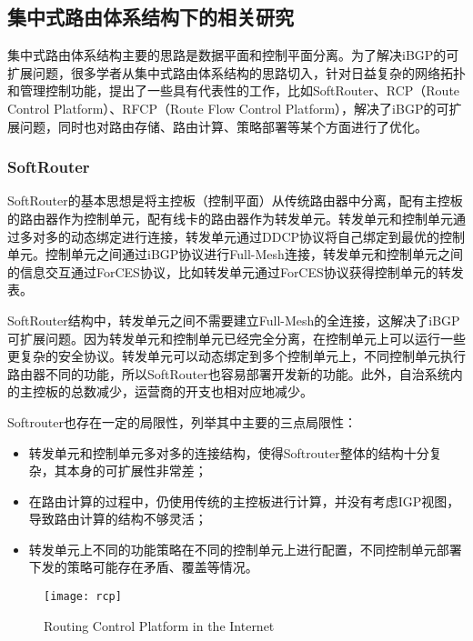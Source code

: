 \subsection{集中式路由体系结构下的相关研究}

集中式路由体系结构主要的思路是数据平面和控制平面分离。为了解决iBGP的可扩展问题，很多学者从集中式路由体系结构的思路切入，针对日益复杂的网络拓扑和管理控制功能，提出了一些具有代表性的工作，比如SoftRouter、RCP（Route Control Platform）、RFCP（Route Flow Control Platform），解决了iBGP的可扩展问题，同时也对路由存储、路由计算、策略部署等某个方面进行了优化。

\subsubsection{SoftRouter\cite{lakshman2004}}
SoftRouter的基本思想是将主控板（控制平面）从传统路由器中分离，配有主控板的路由器作为控制单元，配有线卡的路由器作为转发单元。转发单元和控制单元通过多对多的动态绑定进行连接，转发单元通过DDCP协议将自己绑定到最优的控制单元。控制单元之间通过iBGP协议进行Full-Mesh连接，转发单元和控制单元之间的信息交互通过ForCES\cite{rfc3746}协议，比如转发单元通过ForCES协议获得控制单元的转发表。

SoftRouter结构中，转发单元之间不需要建立Full-Mesh的全连接，这解决了iBGP可扩展问题。因为转发单元和控制单元已经完全分离，在控制单元上可以运行一些更复杂的安全协议。转发单元可以动态绑定到多个控制单元上，不同控制单元执行路由器不同的功能，所以SoftRouter也容易部署开发新的功能。此外，自治系统内的主控板的总数减少，运营商的开支也相对应地减少。

Softrouter也存在一定的局限性，列举其中主要的三点局限性：
\begin{itemize}
  \item 转发单元和控制单元多对多的连接结构，使得Softrouter整体的结构十分复杂，其本身的可扩展性非常差；
  \item 在路由计算的过程中，仍使用传统的主控板进行计算，并没有考虑IGP视图，导致路由计算的结构不够灵活；
  \item 转发单元上不同的功能策略在不同的控制单元上进行配置，不同控制单元部署下发的策略可能存在矛盾、覆盖等情况。
\end{itemize}

\begin{figure}
  \centering
  \texttt{[image: rcp]}
  \caption{Routing Control Platform in the Internet\cite{Feamster2004The}}
  \label{fig:rcp}
\end{figure}


